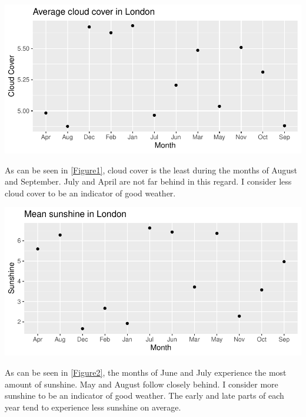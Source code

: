 \documentclass[11pt,preprint, authoryear]{elsarticle}
\let\origfigure\figure
\let\endorigfigure\endfigure
\renewenvironment{figure}[1][2] {
    \expandafter\origfigure\expandafter[H]
} {
    \endorigfigure
}
\numberwithin{equation}{section}
\numberwithin{figure}{section}
\numberwithin{table}{section}
\begin{document}
\begin{figure}[H]

{\centering \includegraphics{Question2_files/figure-latex/Figure1-1} 

}

\caption{Cloud cover \label{Figure1}}\label{fig:Figure1}
\end{figure}

As can be seen in \ref{Figure1}, cloud cover is the least during the
months of August and September. July and April are not far behind in
this regard. I consider less cloud cover to be an indicator of good
weather.

\begin{figure}[H]

{\centering \includegraphics{Question2_files/figure-latex/Figure2-1} 

}

\caption{Sunshine \label{Figure2}}\label{fig:Figure2}
\end{figure}

As can be seen in \ref{Figure2}, the months of June and July experience
the most amount of sunshine. May and August follow closely behind. I
consider more sunshine to be an indicator of good weather. The early and
late parts of each year tend to experience less sunshine on average.
\end{document}
